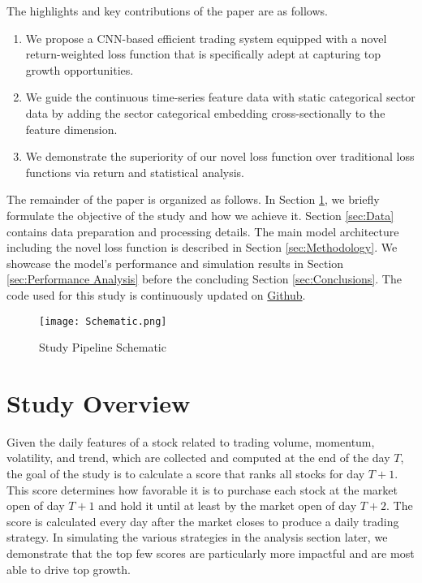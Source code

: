 \documentclass[preprint,12pt,numafflabel,authoryear]{elsarticle}
\begin{document}
The highlights and key contributions of the paper are as follows.

\begin{enumerate}
\item We propose a CNN-based efficient trading system equipped with a novel return-weighted loss function that is specifically adept at capturing top growth opportunities.
\item We guide the continuous time-series feature data with static categorical sector data by adding the sector categorical embedding cross-sectionally to the feature dimension.
\item We demonstrate the superiority of our novel loss function over traditional loss functions via return and statistical analysis.
\end{enumerate}

The remainder of the paper is organized as follows. In Section \ref{sec:Problem Formulation}, we briefly formulate the objective of the study and how we achieve it. Section \ref{sec:Data} contains data preparation and processing details. The main model architecture including the novel loss function is described in Section \ref{sec:Methodology}. We showcase the model's performance and simulation results in Section \ref{sec:Performance Analysis} before the concluding Section \ref{sec:Conclusions}. The code used for this study is continuously updated on \href{https://github.com/Tony-Guo-1/daily_trading_strategy}{Github}.

\begin{figure}
\centering
\texttt{[image: Schematic.png]}
\caption{Study Pipeline Schematic}
\label{fig:schematic}
\end{figure}

\section{Study Overview}
\label{sec:Problem Formulation}
Given the daily features of a stock related to trading volume, momentum, volatility, and trend, which are collected and computed at the end of the day $T$, the goal of the study is to calculate a score that ranks all stocks for day $T+1$. This score determines how favorable it is to purchase each stock at the market open of day $T+1$ and hold it until at least by the market open of day $T+2$. The score is calculated every day after the market closes to produce a daily trading strategy. In simulating the various strategies in the analysis section later, we demonstrate that the top few scores are particularly more impactful and are most able to drive top growth. 
\end{document}

